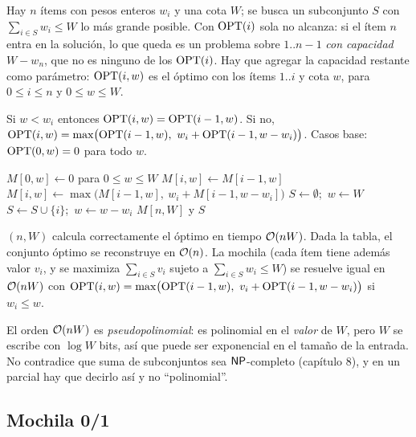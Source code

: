 Hay $n$ ítems con pesos enteros $w_i$ y una cota $W$; se busca un
subconjunto $S$ con $\sum_{i\in S}w_i\le W$ lo más grande posible. Con
$\mathrm{OPT}(i)$ sola no alcanza: si el ítem $n$ entra en la solución, lo que
queda es un problema sobre $1..n-1$ \emph{con capacidad $W-w_n$}, que no es
ninguno de los $\mathrm{OPT}(i)$. Hay que agregar la capacidad restante como
parámetro: $\mathrm{OPT}(i,w)$ es el óptimo con los ítems $1..i$ y cota $w$, para
$0\le i\le n$ y $0\le w\le W$.

\begin{resultado}[(6.8)]
Si $w<w_i$ entonces $\mathrm{OPT}(i,w)=\mathrm{OPT}(i-1,w)$. Si no,
$\OPT(i,w)=\max\bigl(\OPT(i-1,w),\ w_i+\OPT(i-1,w-w_i)\bigr)$.
Casos base: $\mathrm{OPT}(0,w)=0$ para todo $w$.
\end{resultado}

\begin{algorithmic}[1]
\State $M[0,w]\gets 0$ para $0\le w\le W$
     $M[i,w]\gets M[i-1,w]$
    \Else\ $M[i,w]\gets\max\bigl(M[i-1,w],\ w_i+M[i-1,w-w_i]\bigr)$
    \EndIf
  \EndFor
\EndFor
\State $S\gets\emptyset$;\ $w\gets W$
    \State $S\gets S\cup\{i\}$;\ $w\gets w-w_i$
  \EndIf
\EndFor
\State \Return $M[n,W]$ y $S$
\end{algorithmic}

\begin{resultado}[(6.9), (6.10) y (6.11)]
$(n,W)$ calcula correctamente el óptimo en tiempo
$\mathcal{O}(nW)$. Dada la tabla, el conjunto óptimo se reconstruye en $\mathcal{O}(n)$. La
mochila (cada ítem tiene además valor $v_i$, y se maximiza
$\sum_{i\in S}v_i$ sujeto a $\sum_{i\in S}w_i\le W$) se resuelve igual en
$\mathcal{O}(nW)$ con
$\OPT(i,w)=\max\bigl(\OPT(i-1,w),\ v_i+\OPT(i-1,w-w_i)\bigr)$ si $w_i\le w$.
\end{resultado}

El orden $\mathcal{O}(nW)$ es \emph{pseudopolinomial}: es polinomial en el
\emph{valor} de $W$, pero $W$ se escribe con $\log W$ bits, así que puede ser
exponencial en el tamaño de la entrada. No contradice que suma de
subconjuntos sea $\mathsf{NP}$-completo (capítulo 8), y en un parcial hay que decirlo
así y no ``polinomial''.

\subsection{Mochila 0/1}

